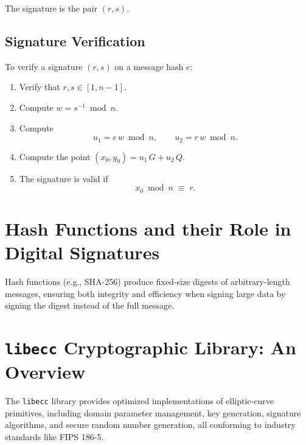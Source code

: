 The signature is the pair \((r, s)\).

\subsection{Signature Verification}

To verify a signature \((r, s)\) on a message hash \(e\):

\begin{enumerate}
	\item Verify that \(r, s \in [1, n-1]\).
	\item Compute \(w = s^{-1} \bmod n\).
	\item Compute 
	\[
	u_1 = e\,w \bmod n,\qquad
	u_2 = r\,w \bmod n.
	\]
	\item Compute the point \((x_0, y_0) = u_1\,G + u_2\,Q\).
	\item The signature is valid if 
	\[
	x_0 \bmod n \;\equiv\; r.
	\]
\end{enumerate}

\section{Hash Functions and their Role in Digital Signatures}

Hash functions (e.g., SHA-256) produce fixed-size digests of arbitrary-length messages, ensuring both integrity and efficiency when signing large data by signing the digest instead of the full message.

\section{\texttt{libecc} Cryptographic Library: An Overview}

The \texttt{libecc} library provides optimized implementations of elliptic-curve primitives, including domain parameter management, key generation, signature algorithms, and secure random number generation, all conforming to industry standards like FIPS 186-5.
